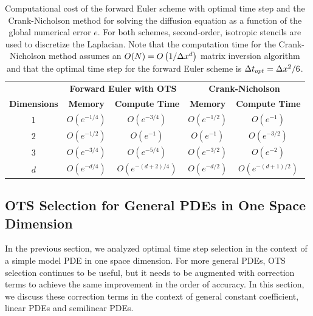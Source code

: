 \documentclass[fleqn,12pt,twoside]{article}
\begin{document}
\begin{table}[tb]
\caption{
Computational cost of the forward Euler scheme with optimal time step and 
the Crank-Nicholson method for solving the diffusion equation as a function 
of the global numerical error $e$.
For both schemes, second-order, isotropic stencils are used to discretize 
the Laplacian.  
Note that the computation time for the Crank-Nicholson method assumes an 
$O(N) = O \left( 1/\Delta x^d \right)$ matrix inversion algorithm 
and that the optimal time step for the forward Euler scheme is $\Delta t_{opt} = \Delta x^2/6$.
}
\label{tab:comp_perf_vs_dim}
\renewcommand{\arraystretch}{1.5}
\begin{tabular}{ccccc}
  \hline
  & \multicolumn{2}{c}{\bf Forward Euler with OTS} 
  & \multicolumn{2}{c}{\bf Crank-Nicholson} \\
  \cline{2-3} \cline{4-5} 
    {\bf Dimensions} & {\bf Memory} & {\bf Compute Time} 
  & {\bf Memory} & {\bf Compute Time} \\
  \hline 
  $1$ & $O\left( e^{-1/4} \right)$ 
      & $O\left( e^{-3/4} \right)$ 
      & $O\left( e^{-1/2} \right)$ 
      & $O\left( e^{-1} \right)$ \\ 
  $2$ & $O\left( e^{-1/2} \right)$ 
      & $O\left( e^{-1} \right)$ 
      & $O\left( e^{-1} \right)$ 
      & $O\left( e^{-3/2} \right)$ \\ 
  $3$ & $O\left( e^{-3/4} \right)$ 
      & $O\left( e^{-5/4} \right)$ 
      & $O\left( e^{-3/2} \right)$ 
      & $O\left( e^{-2} \right)$ \\
  $d$ & $O\left( e^{-d/4} \right)$ 
      & $O\left( e^{-(d+2)/4} \right)$ 
      & $O\left( e^{-d/2} \right)$ 
      & $O\left( e^{-(d+1)/2} \right)$ \\ 
  \hline 
\end{tabular}
\end{table}



\subsection{\label{sec:ots_general_1d_pdes} 
            OTS Selection for General PDEs in One Space Dimension} 
In the previous section, we analyzed optimal time step selection in the 
context of a simple model PDE in one space dimension.  For more general PDEs, 
OTS selection continues to be useful, but it needs to be augmented with 
correction terms to achieve the same improvement in the order of accuracy.  
In this section, we discuss these correction terms in the context of general 
constant coefficient, linear PDEs and semilinear PDEs. 
\end{document}
